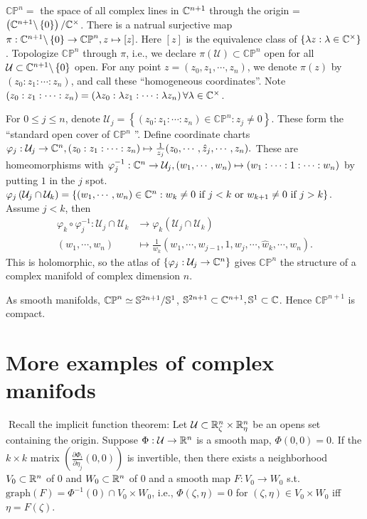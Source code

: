 \begin{example}
  $\mathbb{CP}^{n}=$ the space of all complex lines in $\mathbb{C}^{n+1}$ through the origin = $\left( \mathbb{C}^{n+1}\backslash \left\{0\right\}  \right) / \mathbb{C}^{\times }$. There is a natrual surjective map $\pi:\mathbb{C}^{n+1}\backslash  \left\{0\right\} \to \mathbb{CP}^{n}, z\mapsto [z]$. Here $[z]$ is the equivalence class of $\left\{\lambda z:\lambda \in \mathbb{C}^{\times }\right\} $. Topologize $\mathbb{CP}^{n}$ through $\pi$, i.e., we declare $\pi(\mathcal{U})\subset \mathbb{CP}^{n}$ open for all $\mathcal{U}\subset \mathbb{C}^{n+1}\backslash \left\{0\right\} $ open. For any point $z=\left( z_0,z_1,\cdots ,z_n \right) $, we denote $\pi(z)$ by $(z_0:z_1:\cdots :z_n)$, and call these ``homogeneous coordinates''. Note $(z_0:z_1:\cdots :z_n)=\left( \lambda z_0:\lambda z_1:\cdots :\lambda z_n \right) \forall \lambda \in  \mathbb{C}^{\times }$.

  For $0\le j\le n$, denote $\mathcal{U}_j=\left\{\left( z_0:z_1:\cdots :z_n \right) \in \mathbb{CP}^{n}:z_j\neq 0\right\} $. These form the ``standard open cover of $\mathbb{CP}^{n}$ ''. Define coordinate charts $\varphi_j:\mathcal{U}_j\to \mathbb{C}^{n},(z_0:z_1:\cdots :z_n)\mapsto \frac{1}{z_j}(z_0,\cdots ,\hat{z}_j,\cdots ,z_n).$ These are homeomorphisms with $\varphi_j^{-1}:\mathbb{C}^{n}\to \mathcal{U}_j, (w_1,\cdots ,w_n)\mapsto (w_1:\cdots :1:\cdots :w_n)$ by putting  $1$ in the $j$ spot.
  $\varphi_j\left( \mathcal{U}_j\cap \mathcal{U}_k \right) =\left\{(w_1,\cdots ,w_n) \in \mathbb{C}^{n}: w_k\neq 0 \text{ if }j<k \text{ or } w_{k+1}\neq 0 \text{ if }j>k\right\} $. Assume $j<k$, then 
  \begin{align*}
    \varphi_k\circ \varphi_j^{-1}: \mathcal{U}_j\cap \mathcal{U}_k &\longrightarrow \varphi_k(\mathcal{U}_j\cap \mathcal{U}_k) \\
    (w_1,\cdots ,w_n) &\longmapsto  \frac{1}{w_k}\left( w_1,\cdots ,w_{j-1},1,w_j,\cdots ,\widehat{w}_k,\cdots ,w_n \right) 			
  .\end{align*}
  This is holomorphic, so the atlas of $\left\{\varphi_j:\mathcal{U}_j\to \mathbb{C}^{n}\right\} $ gives $\mathbb{CP}^{n}$ the structure of a complex manifold of complex dimension $n$.

  As smooth manifolds, $\mathbb{CP}^{n}\simeq \mathbb{S}^{2n+1} /\mathbb{S}^1$, $\mathbb{S}^{2n+1}\subset \mathbb{C}^{n+1},\mathbb{S}^{1}\subset \mathbb{C}$.
  Hence $\mathbb{CP}^{n+1}$ is compact.
\end{example}

\section{More examples of complex manifods}
Recall the implicit function theorem: Let $\mathcal{U}\subset \mathbb{R}^{n}_\zeta\times \mathbb{R}^{n}_\eta$ be an opens set containing the origin. Suppose $\Phi:\mathcal{U}\to \mathbb{R}^{n}$ is a smooth map, $\Phi(0,0)=0$. If the $k\times k$ matrix $\left( \frac{\partial \Phi_i}{\partial \eta_j} (0,0)\right) $ is invertible, then there exists a neighborhood $V_0 \subset  \mathbb{R}^{n}$ of $0$ and $W_0 \subset  \mathbb{R}^{n}$ of $0$ and a smooth map $F:V_0\to W_0$ s.t. $\mathrm{graph}(F)=\Phi^{-1}(0) \cap  V_0 \times W_0$, i.e., $\Phi(\zeta,\eta)=0$ for $(\zeta,\eta)\in  V_0\times W_0$ iff $\eta=F(\zeta)$.

